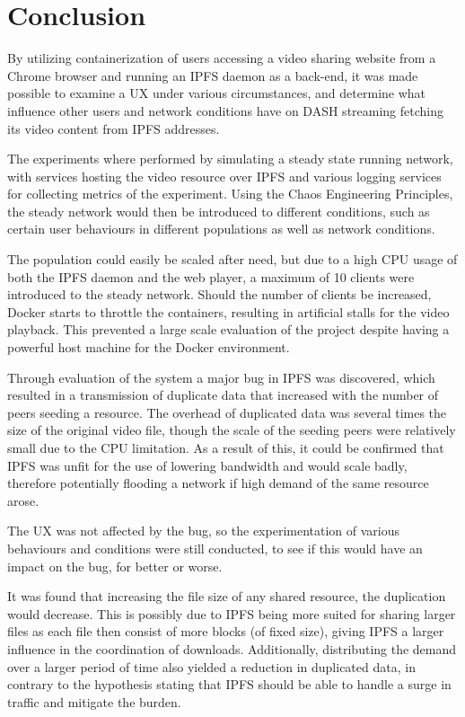 \chapter{Conclusion}
\label{cha:conclusion}

By utilizing containerization of users accessing a video sharing website from a Chrome browser and running an \ac{IPFS} daemon as a back-end, it was made possible to examine a \ac{UX} under various circumstances, and determine what influence other users and network conditions have on \ac{DASH} streaming fetching its video content from \ac{IPFS} addresses.

The experiments where performed by simulating a steady state running network, with services hosting the video resource over \ac{IPFS} and various logging services for collecting metrics of the experiment.
Using the Chaos Engineering Principles, the steady network would then be introduced to different conditions, such as certain user behaviours in different populations as well as network conditions.

The population could easily be scaled after need, but due to a high \ac{CPU} usage of both the \ac{IPFS} daemon and the web player, a maximum of 10 clients were introduced to the steady network. Should the number of clients be increased, Docker starts to throttle the containers, resulting in artificial stalls for the video playback. This prevented a large scale evaluation of the project despite having a powerful host machine for the Docker environment.

Through evaluation of the system a major bug in \ac{IPFS} was discovered, which resulted in a transmission of duplicate data that increased with the number of peers seeding a resource. The overhead of duplicated data was several times the size of the original video file, though the scale of the seeding peers were relatively small due to the \ac{CPU} limitation. As a result of this, it could be confirmed that \ac{IPFS} was unfit for the use of lowering bandwidth and would scale badly, therefore potentially flooding a network if high demand of the same resource arose.

The \ac{UX} was not affected by the bug, so the experimentation of various behaviours and conditions were still conducted, to see if this would have an impact on the bug, for better or worse.

It was found that increasing the file size of any shared resource, the duplication would decrease. This is possibly due to \ac{IPFS} being more suited for sharing larger files as each file then consist of more blocks (of fixed size), giving \ac{IPFS} a larger influence in the coordination of downloads. Additionally, distributing the demand over a larger period of time also yielded a reduction in duplicated data, in contrary to the hypothesis stating that \ac{IPFS} should be able to handle a surge in traffic and mitigate the burden.


